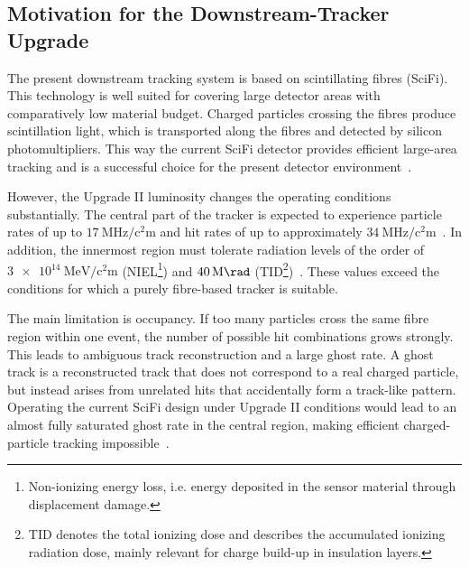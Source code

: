 \subsection{Motivation for the Downstream-Tracker Upgrade}\label{sec:motivation_upgrade}
The present downstream tracking system is based on scintillating fibres (SciFi). This technology is well suited for covering large detector areas with comparatively low material budget. Charged particles crossing the fibres produce scintillation light, which is transported along the fibres and detected by silicon photomultipliers. This way the current SciFi detector provides efficient large-area tracking and is a successful choice for the present detector environment~\cite{Schmitz2026-je, DeFreitasCarneiroDaGraca:2924059}.\par
However, the Upgrade II luminosity changes the operating conditions substantially. The central part of the tracker is expected to experience particle rates of up to $\SI{17}{\mega\hertz\per\square\centi\meter}$ and hit rates of up to approximately $\SI{34}{\mega\hertz\per\square\centi\meter}$~\cite{VilellaFigueras2025-maps}. In addition, the innermost region must tolerate radiation levels of the order of $\SI{3e14}{\mega\electronvolt\per\square\centi\meter}$ (NIEL\footnote{Non-ionizing energy loss, i.e. energy deposited in the sensor material through displacement damage.}) and $\SI{40}{\mega\rad}$ (TID\footnote{TID denotes the total ionizing dose and describes the accumulated ionizing radiation dose, mainly relevant for charge build-up in insulation layers.})~\cite{VilellaFigueras2025-maps}. These values exceed the conditions for which a purely fibre-based tracker is suitable.\par
The main limitation is occupancy. If too many particles cross the same fibre region within one event, the number of possible hit combinations grows strongly. This leads to ambiguous track reconstruction and a large ghost rate. A ghost track is a reconstructed track that does not correspond to a real charged particle, but instead arises from unrelated hits that accidentally form a track-like pattern. Operating the current SciFi design under Upgrade II conditions would lead to an almost fully saturated ghost rate in the central region, making efficient charged-particle tracking impossible~\cite{Schmitz2026-je}.
%
